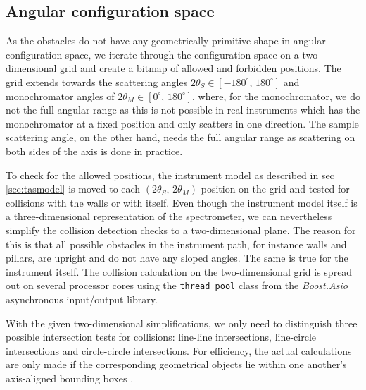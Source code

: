 \subsection{Angular configuration space}
As the obstacles do not have any geometrically primitive shape in angular configuration space, we iterate
through the configuration space on a two-dimensional grid and create a bitmap of allowed and forbidden
positions. The grid extends towards the scattering angles $2\theta_S \in \left[ -180^{\circ},\, 180^{\circ} \right]$
and monochromator angles of $2\theta_M \in \left[0^{\circ},\, 180^{\circ} \right]$, where, for the monochromator, we do
not the full angular range as this is not possible in real instruments which has the monochromator at a fixed position
and only scatters in one direction. The sample scattering angle, on the other hand, needs the full angular range as
scattering on both sides of the axis is done in practice.

To check for the allowed positions, the instrument model as described in sec \ref{sec:tasmodel} is moved to
each $\left( 2\theta_S,\, 2\theta_M \right)$ position on the grid and tested for collisions with the walls or with
itself. Even though the instrument model itself is a three-dimensional representation of the spectrometer, we
can nevertheless simplify the collision detection checks to a two-dimensional plane. The reason for this is
that all possible obstacles in the instrument path, for instance walls and pillars, are upright and do not have
any sloped angles. The same is true for the instrument itself.
The collision calculation on the two-dimensional grid is spread out on several processor cores using 
the \lstinline[language=C++]|thread_pool| \cite{web_boost_asio_threadpool} class from the 
\textit{Boost.Asio} \cite{web_boost_asio} asynchronous input/output library.

With the given two-dimensional simplifications, we only need to distinguish three possible intersection tests for collisions: 
line-line intersections, line-circle intersections and circle-circle intersections. 
For efficiency, the actual calculations are only made if the corresponding geometrical objects lie within 
one another's axis-aligned bounding boxes \cite{web_aabb}.

